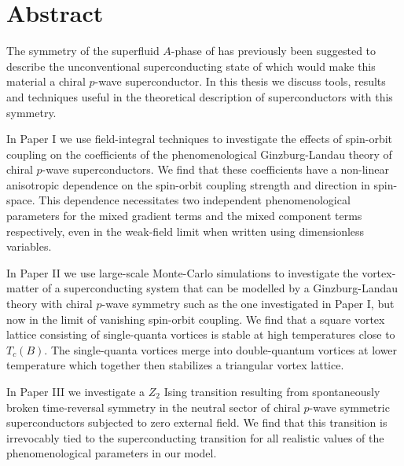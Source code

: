 \chapter*{Abstract}\noindent
%
The symmetry of the superfluid $A$-phase of  has previously been suggested to describe the unconventional superconducting state
of  which would make this material a chiral $p$-wave superconductor. In this thesis we discuss tools, results and 
techniques useful in the theoretical description of superconductors with this symmetry.

In Paper I we use field-integral techniques to investigate the effects of spin-orbit coupling on the coefficients of the phenomenological
Ginzburg-Landau theory of chiral $p$-wave superconductors. We find that these coefficients have a non-linear anisotropic dependence on the
spin-orbit coupling strength and direction in spin-space. This dependence necessitates two independent phenomenological parameters for
the mixed gradient terms and the mixed component terms respectively, even in the weak-field limit when written using
dimensionless variables.

In Paper II we use large-scale Monte-Carlo simulations to investigate the vortex-matter of a superconducting system that can be modelled
by a Ginzburg-Landau theory with chiral $p$-wave symmetry such as the one investigated in Paper I, but now in the limit of vanishing
spin-orbit coupling. We find that a square vortex lattice consisting of single-quanta vortices is stable at high temperatures close to
$T_c(B)$. The single-quanta vortices merge into double-quantum vortices at lower temperature which together then stabilizes a triangular
vortex lattice.

In Paper III we investigate a $Z_2$ Ising transition resulting from spontaneously broken time-reversal symmetry in the neutral sector
of chiral $p$-wave symmetric superconductors subjected to zero external field. We find that this transition is irrevocably tied to
the superconducting transition for all realistic values of the phenomenological parameters in our model.

